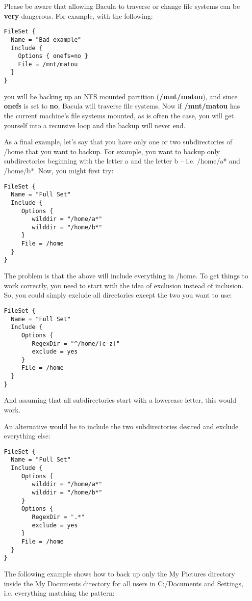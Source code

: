 Please be aware that allowing Bacula to traverse or change file systems can be
{\bf very} dangerous. For example, with the following: 

\footnotesize
\begin{verbatim}
FileSet {
  Name = "Bad example"
  Include {
    Options { onefs=no }
    File = /mnt/matou
  }
}
\end{verbatim}
\normalsize

you will be backing up an NFS mounted partition ({\bf /mnt/matou}), and since
{\bf onefs} is set to {\bf no}, Bacula will traverse file systems. Now if {\bf
/mnt/matou} has the current machine's file systems mounted, as is often the
case, you will get yourself into a recursive loop and the backup will never
end. 

As a final example, let's say that you have only one or two 
subdirectories of /home that you want to backup.  For example,
you want to backup only subdirectories beginning with the letter
a and the letter b -- i.e. /home/a* and /home/b*.  Now, you might first
try:
\footnotesize
\begin{verbatim}
FileSet {
  Name = "Full Set"
  Include {
     Options {
        wilddir = "/home/a*"
        wilddir = "/home/b*"
     }
     File = /home
  }
}
\end{verbatim}
\normalsize

The problem is that the above will include everything in /home.  To get
things to work correctly, you need to start with the idea of exclusion
instead of inclusion.  So, you could simply exclude all directories
except the two you want to use:
\footnotesize
\begin{verbatim}
FileSet {
  Name = "Full Set"
  Include {
     Options {
        RegexDir = "^/home/[c-z]"
        exclude = yes
     }
     File = /home
  }
}
\end{verbatim}
\normalsize

And assuming that all subdirectories start with a lowercase letter, this
would work.

An alternative would be to include the two subdirectories desired and
exclude everything else:
\footnotesize
\begin{verbatim}
FileSet {
  Name = "Full Set"
  Include {
     Options {
        wilddir = "/home/a*"
        wilddir = "/home/b*"
     }
     Options {
        RegexDir = ".*"
        exclude = yes
     }
     File = /home
  }
}
\end{verbatim}
\normalsize


The following example shows how to back up only the My Pictures directory inside
the My Documents directory for all users in C:/Documents and Settings, i.e.
everything matching the pattern:

